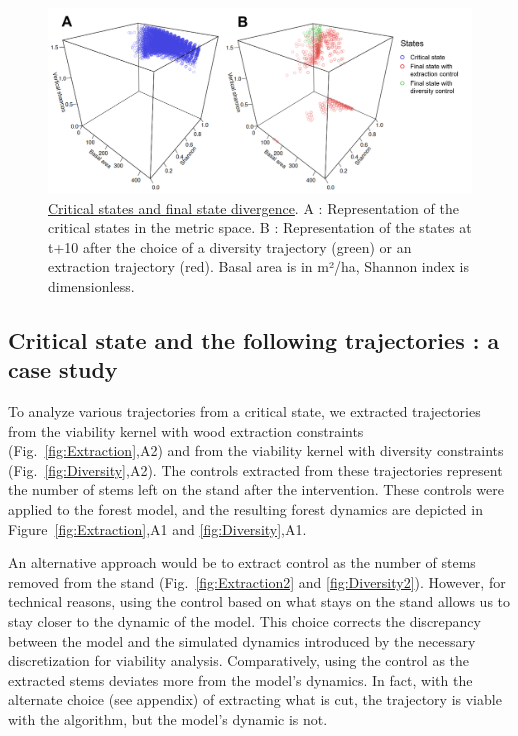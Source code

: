 \documentclass{article}
\begin{document}
\begin{figure}[hb!] 
    \centering
    \includegraphics[width=\textwidth]{Figure/Results/Criticals_states.png}
    \caption{\underline{Critical states and final state divergence}. A : Representation of the critical states in the metric space. B : Representation of the states at t+10 after the choice of a diversity trajectory (green) or an extraction trajectory (red). Basal area is in m²/ha, Shannon index is dimensionless.}
    \label{fig:Criticals_states}
\end{figure}

\subsection{Critical state and the following trajectories : a case study}

To analyze various trajectories from a critical state, we extracted trajectories from the viability kernel with wood extraction constraints (Fig.~\ref{fig:Extraction},A2) and from the viability kernel with diversity constraints (Fig.~\ref{fig:Diversity},A2). The controls extracted from these trajectories represent the number of stems left on the stand after the intervention. These controls were applied to the forest model, and the resulting forest dynamics are depicted in Figure~\ref{fig:Extraction},A1 and \ref{fig:Diversity},A1.

An alternative approach would be to extract control as the number of stems removed from the stand (Fig.~\ref{fig:Extraction2} and \ref{fig:Diversity2}). However, for technical reasons, using the control based on what stays on the stand allows us to stay closer to the dynamic of the model. This choice corrects the discrepancy between the model and the simulated dynamics introduced by the necessary discretization for viability analysis. Comparatively, using the control as the extracted stems deviates more from the model's dynamics. In fact, with the alternate choice (see appendix) of extracting what is cut, the trajectory is viable with the algorithm, but the model's dynamic is not.
\end{document}
